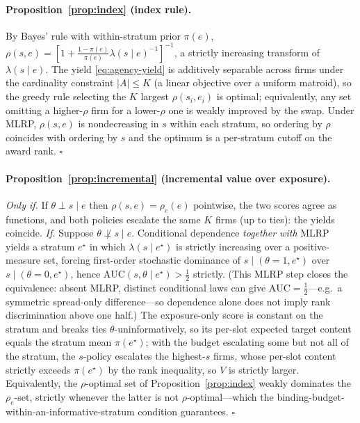 \paragraph{Proposition~\ref{prop:index} (index rule).}
By Bayes' rule with within-stratum prior $\pi(e)$,
$\rho(s,e)=[1+\tfrac{1-\pi(e)}{\pi(e)}\lambda(s\mid e)^{-1}]^{-1}$,
a strictly increasing transform of $\lambda(s\mid e)$. The yield
\eqref{eq:agency-yield} is additively separable across firms under
the cardinality constraint $|A|\le K$ (a linear objective over a
uniform matroid), so the greedy rule selecting the $K$ largest
$\rho(s_i,e_i)$ is optimal; equivalently, any set omitting a
higher-$\rho$ firm for a lower-$\rho$ one is weakly improved by the
swap. Under MLRP, $\rho(s,e)$ is nondecreasing in $s$ within each
stratum, so ordering by $\rho$ coincides with ordering by $s$ and
the optimum is a per-stratum cutoff on the award rank.
\hfill$\square$

\paragraph{Proposition~\ref{prop:incremental} (incremental value over exposure).}
\emph{Only if.} If $\theta\perp s\mid e$ then
$\rho(s,e)=\rho_e(e)$ pointwise, the two scores agree as
functions, and both policies escalate the same $K$ firms (up to
ties): the yields coincide. \emph{If.} Suppose
$\theta\not\perp s\mid e$. Conditional dependence \emph{together
with} MLRP yields a stratum $e^\star$ in which
$\lambda(s\mid e^\star)$ is strictly increasing over a
positive-measure set, forcing first-order stochastic dominance of
$s\mid(\theta=1,e^\star)$ over $s\mid(\theta=0,e^\star)$, hence
$\mathrm{AUC}(s,\theta\mid e^\star)>\tfrac12$ strictly. (This MLRP
step closes the equivalence: absent MLRP, distinct conditional
laws can give $\mathrm{AUC}=\tfrac12$---e.g.\ a symmetric
spread-only difference---so dependence alone does not imply rank
discrimination above one half.) The exposure-only score is
constant on the stratum and breaks ties
$\theta$-uninformatively, so its per-slot expected target content
equals the stratum mean $\pi(e^\star)$; with the budget escalating
some but not all of the stratum, the $s$-policy escalates the
highest-$s$ firms, whose per-slot content strictly exceeds
$\pi(e^\star)$ by the rank inequality, so $V$ is strictly larger.
Equivalently, the $\rho$-optimal set of
Proposition~\ref{prop:index} weakly dominates the $\rho_e$-set,
strictly whenever the latter is not $\rho$-optimal---which the
binding-budget-within-an-informative-stratum condition guarantees.
\hfill$\square$

